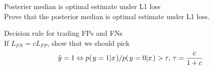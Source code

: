 \documentclass[a4paper,twoside=false,abstract=false,numbers=noenddot,
titlepage=false,headings=small,parskip=half,version=last]{scrartcl}
\begin{document}

\begin{exercise}{5.1}
    
\end{exercise}
\begin{solution}
    
\end{solution}

\begin{exercise}{5.3} 
\end{exercise}
\begin{solution}

\end{solution}

\begin{exercise}{5.9} Posterier median is optimal estimate under L1 loss\\
    Prove that the posterior median is optimal estimate under L1 loss.
\end{exercise}
\begin{solution}

\end{solution}

\begin{exercise}{5.10} Decision rule for trading FPs and FNs\\
    If $L_{FN}=cL_{FP}$, show that we should pick 
    \begin{equation}
        \hat{y}=1 \Leftrightarrow p{(\left. y=1 \middle\vert x \right.)}/p{(\left. y=0 \middle\vert x \right.)}>\tau,\,
        \tau=\frac{c}{1+c}
    \end{equation}
\end{exercise}
\begin{solution}
    
\end{solution}

\end{document}

